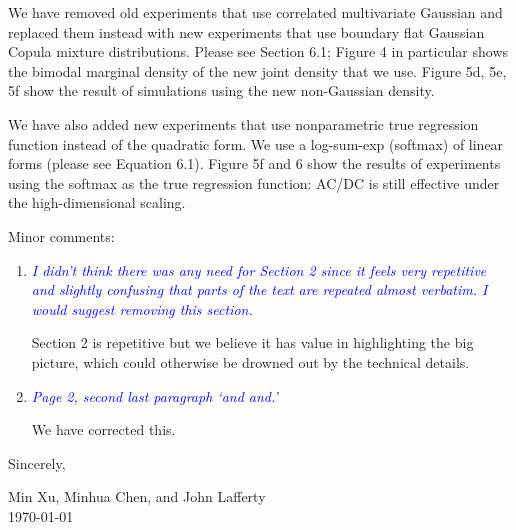 \documentclass[pdftex,12pt]{article}
\def\rc#1{{\it\textcolor{blue}{#1}}\smallskip}
\begin{document}
\begin{enumerate}
We have removed old experiments that use correlated multivariate Gaussian and replaced them instead with new experiments that use boundary flat Gaussian Copula mixture distributions. Please see Section 6.1; Figure 4 in particular shows the bimodal marginal density of the new joint density that we use. Figure 5d, 5e, 5f show the result of simulations using the new non-Gaussian density.

We have also added new experiments that use nonparametric true regression function instead of the quadratic form. We use a log-sum-exp (softmax) of linear forms (please see Equation 6.1). Figure 5f and 6 show the results of experiments using the softmax as the true regression function: AC/DC is still effective under the high-dimensional scaling. 


\end{enumerate}

Minor comments:

\begin{enumerate}
\item \rc{I didn't think there was any need for Section 2
  since it feels very repetitive and slightly confusing that parts of
  the text are repeated almost verbatim. I would suggest removing this section.}

Section 2 is repetitive but we believe it has value in highlighting the big picture, which could otherwise be drowned out by the technical details. 

\item \rc{Page 2, second last paragraph `and and.'}

We have corrected this.

\end{enumerate}


\vspace*{10pt}

Sincerely, 


Min Xu, Minhua Chen, and John Lafferty\\[1pt]
\today{}


\end{document}
